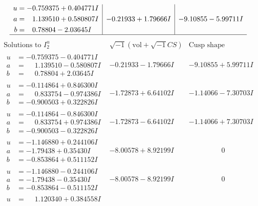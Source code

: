 \documentclass[1p]{elsarticle_modified}
\theoremstyle{definition}
\newcommand{\I}{\sqrt{-1}}
\begin{document}
$$\begin{array}{c|c|c}
\begin{aligned}
u &= -0.759375 + 0.404771 I \\
a &= \phantom{-}1.139510 + 0.580807 I \\
b &= \phantom{-}0.78804 - 2.03645 I\end{aligned}
 & -0.21933 + 1.79666 I & -9.10855 - 5.99711 I\\
 \hline 
 \end{array}$$\newpage$$\begin{array}{c|c|c}  
\text{Solutions to }I^u_{2}& \I (\text{vol} + \sqrt{-1}CS) & \text{Cusp shape}\\
 \hline 
\begin{aligned}
u &= -0.759375 - 0.404771 I \\
a &= \phantom{-}1.139510 - 0.580807 I \\
b &= \phantom{-}0.78804 + 2.03645 I\end{aligned}
 & -0.21933 - 1.79666 I & -9.10855 + 5.99711 I \\ \hline\begin{aligned}
u &= -0.114864 + 0.846300 I \\
a &= \phantom{-}0.833754 - 0.974386 I \\
b &= -0.900503 + 0.322826 I\end{aligned}
 & -1.72873 + 6.64102 I & -1.14066 - 7.30703 I \\ \hline\begin{aligned}
u &= -0.114864 - 0.846300 I \\
a &= \phantom{-}0.833754 + 0.974386 I \\
b &= -0.900503 - 0.322826 I\end{aligned}
 & -1.72873 - 6.64102 I & -1.14066 + 7.30703 I \\ \hline\begin{aligned}
u &= -1.146880 + 0.244106 I \\
a &= -1.79438 + 0.35430 I \\
b &= -0.853864 + 0.511152 I\end{aligned}
 & -8.00578 + 8.92199 I & \phantom{-0.000000 } 0 \\ \hline\begin{aligned}
u &= -1.146880 - 0.244106 I \\
a &= -1.79438 - 0.35430 I \\
b &= -0.853864 - 0.511152 I\end{aligned}
 & -8.00578 - 8.92199 I & \phantom{-0.000000 } 0 \\ \hline\begin{aligned}
u &= \phantom{-}1.120340 + 0.384558 I \\

\end{aligned}
\end{array}$$
\end{document}
